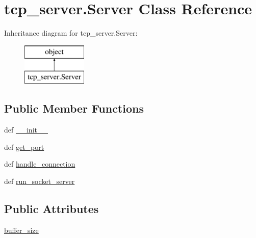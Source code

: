 \hypertarget{classtcp__server_1_1_server}{\section{tcp\-\_\-server.\-Server Class Reference}
\label{classtcp__server_1_1_server}
}
Inheritance diagram for tcp\-\_\-server.\-Server\-:\begin{figure}[H]
\begin{center}
\leavevmode
\includegraphics[height=2.000000cm]{classtcp__server_1_1_server}
\end{center}
\end{figure}
\subsection*{Public Member Functions}
\begin{DoxyCompactItemize}
\item 
def \hyperlink{classtcp__server_1_1_server_a708132c7505416c9b374d0b9013e8621}{\-\_\-\-\_\-init\-\_\-\-\_\-}
\item 
def \hyperlink{classtcp__server_1_1_server_a22124301cee8b0b1421354e4cea28481}{get\-\_\-port}
\item 
def \hyperlink{classtcp__server_1_1_server_a2a864226ef243124eec7b38ad5171513}{handle\-\_\-connection}
\item 
def \hyperlink{classtcp__server_1_1_server_a56aca41e09a8b0d0e05940d8b51111eb}{run\-\_\-socket\-\_\-server}
\end{DoxyCompactItemize}
\subsection*{Public Attributes}
\begin{DoxyCompactItemize}
\item 
\hyperlink{classtcp__server_1_1_server_aa0e56b6c0603c767cceb98a5ffda3f2d}{buffer\-\_\-size}
\end{DoxyCompactItemize}


